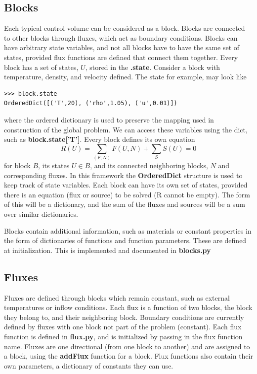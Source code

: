 \documentclass[11pt]{article}
\begin{document}
\subsection{Blocks}
Each typical control volume can be considered as a block. Blocks are connected to other blocks through fluxes, which act as boundary conditions. Blocks can have arbitrary state variables, and not all blocks have to have the same set of states, provided flux functions are defined that connect them together. Every block has a set of states, $U$, stored in the {\bf .state}. Consider a block with temperature, density, and velocity defined. The state for example, may look like
\begin{verbatim}
>>> block.state
OrderedDict([('T',20), ('rho',1.05), ('u',0.01)])
\end{verbatim}
where the ordered dictionary is used to preserve the mapping used in construction of the global problem. We can access these variables using the dict, such as {\bf block.state['T']}. Every block defines its own equation
\begin{equation}
R(U) = \sum_{(F,N)} F(U,N) + \sum_S S(U) = 0
\end{equation}
for block $B$, its states $U \in B$, and its connected neighboring blocks, $N$ and corresponding fluxes. In this framework the {\bf OrderedDict} structure is used to keep track of state variables. Each block can have its own set of states, provided there is an equation (flux or source) to be solved (R cannot be empty). The form of this will be a dictionary, and the sum of the fluxes and sources will be a sum over similar dictionaries.

Blocks contain additional information, such as materials or constant properties in the form of dictionaries of functions and function parameters. These are defined at initialization. This is implemented and documented in {\bf blocks.py}
\subsection{Fluxes}
Fluxes are defined through blocks which remain constant, such as external temperatures or inflow conditions. Each flux is a function of two blocks, the block they belong to, and their neighboring block. Boundary conditions are currently defined by fluxes with one block not part of the problem (constant). Each flux function is defined in {\bf flux.py}, and is initialized by passing in the flux function name. Fluxes are one directional (from one block to another) and are assigned to a block, using the {\bf addFlux} function for a block. Flux functions also contain their own parameters, a dictionary of constants they can use.
\end{document}
